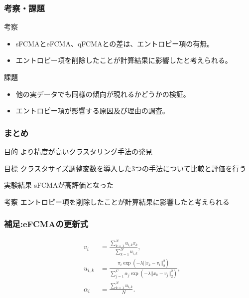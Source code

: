 \documentclass[13pt,dvipdfmx]{beamer}
\begin{document}
\begin{frame}\frametitle{考察・課題}
  \begin{block}{考察}
    \begin{itemize}
    \item sFCMAとeFCMA、qFCMAとの差は、エントロピー項の有無。
    \item エントロピー項を削除したことが計算結果に影響したと考えられる。
    \end{itemize}
  \end{block}
  \begin{block}{課題}
    \begin{itemize}
    \item 他の実データでも同様の傾向が現れるかどうかの検証。
    \item エントロピー項が影響する原因及び理由の調査。
    \end{itemize}
  \end{block}
\end{frame}

\begin{frame}\frametitle{まとめ}
  \begin{block}{目的}
   より精度が高いクラスタリング手法の発見
  \end{block}
  \vspace{4mm}
  \begin{block}{目標}
   クラスタサイズ調整変数を導入した3つの手法について比較と評価を行う
  \end{block}
  \begin{block}{実験結果}
   sFCMAが高評価となった
  \end{block}
  \begin{block}{考察}
   エントロピー項を削除したことが計算結果に影響したと考えられる
  \end{block}
\end{frame}

\begin{frame}\frametitle{補足:eFCMAの更新式}
  \begin{eqnarray*}
    &v_{i}& =\frac{\sum_{k=1}^Nu_{i,k}x_{k}}{\quad\sum_{k=1}^Nu_{i,k}},\\
    &u_{i,k}&=\frac{\pi_{i}\exp(-\lambda||x_k-v_i||_2^2)}{\sum_{j=1}^C\alpha_{j}\exp(-\lambda||x_k-v_j||_2^2)},\\
    &\alpha_{i}&=\frac{\sum_{k=1}^Nu_{i,k}}{\quad N}.\\
  \end{eqnarray*}
\end{frame}
\end{document}
